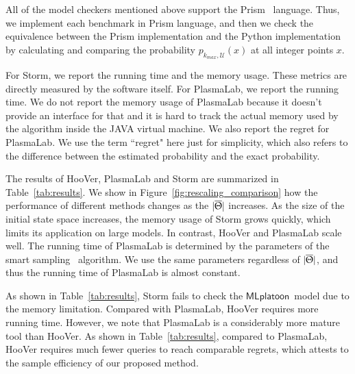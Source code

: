 \documentclass[11pt]{article}
\theoremstyle{definition}
\newcommand{\sayan}[1]{\textcolor{blue}{#1}}
\newcommand{\phit}[3]{{p_{#1,#2}{(#3)}}}
\newcommand{\Unsafe}{\mathcal{U}}
\newcommand{\SlplatoonTwo}{{$\mathsf{SLplatoon2}$\xspace}}
\newcommand{\Mlplatoon}{{$\mathsf{MLplatoon}$\xspace}}
\newcommand{\toolname}{{{\sf HooVer}\xspace}}
\begin{document}
All of the model checkers mentioned above support the Prism~\cite{HKNP06} language. Thus, we implement each benchmark in Prism language, and then we check the equivalence between the Prism implementation and the Python implementation by calculating and comparing the probability $\phit{k_{\mathit{max}}}{\Unsafe}{x}$ at all integer points $x$.

For Storm, we report the running time and the memory usage. These metrics are directly measured by the software itself. For PlasmaLab, we report the running time. We do not report the memory usage of PlasmaLab because it doesn't provide an interface for that and it is hard to track the actual memory used by the algorithm inside the JAVA virtual machine. We also report the regret for PlasmaLab. We use the term ``regret" here just for simplicity, which also refers to the difference between the estimated probability and the exact probability.

The results of \toolname{}, PlasmaLab and Storm are summarized in Table~\ref{tab:results}. We show in Figure~\ref{fig:rescaling_comparison} how the performance of different methods changes as the $|\overline{\Uptheta}|$ increases. As the size of the initial state space increases, the memory usage of Storm grows quickly, which limits its application on large models. In contrast, \toolname{}  and PlasmaLab scale well. The running time of PlasmaLab is determined by the parameters of the smart sampling~\cite{d2015smart} algorithm. We use the same parameters regardless of $|\overline{\Uptheta}|$, and thus the running time of PlasmaLab is almost constant.


As shown in Table~\ref{tab:results}, Storm fails to check the \Mlplatoon\ model due to the memory limitation. Compared with PlasmaLab, \toolname{} requires more running time.
%
However, we note that PlasmaLab is a considerably more mature tool than  \toolname.  As shown in Table~\ref{tab:results}, compared to PlasmaLab, \toolname{} requires much fewer queries to reach comparable regrets, which attests to the sample efficiency of our proposed method.
\end{document}
